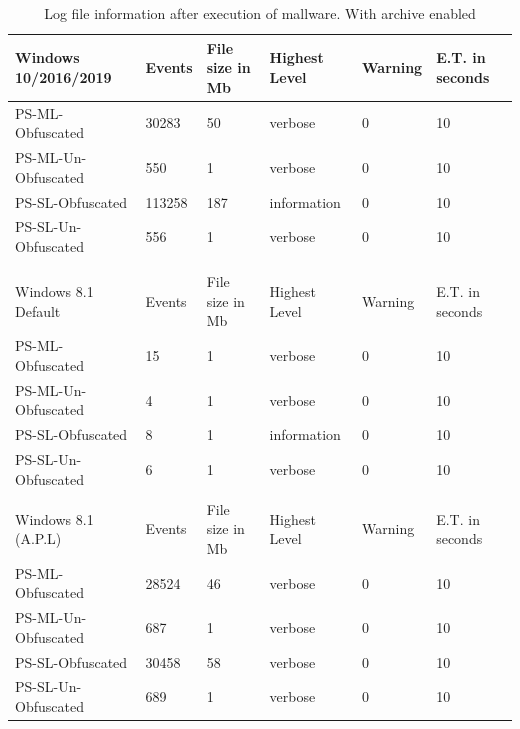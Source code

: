 \documentclass{article}%
\begin{document}
\begin{table}
\begin{center}
\caption {Log file information after execution of mallware. With archive enabled} \label{tab:table_seven}
\begin{tabular}{|l|l|l|l|l|l|}\hline
Windows 10/2016/2019 & Events & File size in Mb & Highest Level & Warning & E.T. in seconds  \\\hline
PS-ML-Obfuscated     & 30283  & 50              & verbose       & 0       & 10               \\\hline
PS-ML-Un-Obfuscated  & 550    & 1               & verbose       & 0       & 10               \\\hline
PS-SL-Obfuscated     & 113258 & 187             & information   & 0       & 10               \\\hline
PS-SL-Un-Obfuscated  & 556    & 1               & verbose       & 0       & 10               \\\hline
                     &        &                 &               &         &                  \\\hline
                     &        &                 &               &         &                  \\\hline
Windows 8.1 Default  & Events & File size in Mb & Highest Level & Warning & E.T. in seconds  \\\hline
PS-ML-Obfuscated     & 15     & 1               & verbose       & 0       & 10               \\\hline
PS-ML-Un-Obfuscated  & 4      & 1               & verbose       & 0       & 10               \\\hline
PS-SL-Obfuscated     & 8      & 1               & information   & 0       & 10               \\\hline
PS-SL-Un-Obfuscated  & 6      & 1               & verbose       & 0       & 10               \\\hline
                     &        &                 &               &         &                  \\\hline
Windows 8.1 (A.P.L)  & Events & File size in Mb & Highest Level & Warning & E.T. in seconds  \\\hline
PS-ML-Obfuscated     & 28524  & 46              & verbose       & 0       & 10               \\\hline
PS-ML-Un-Obfuscated  & 687    & 1               & verbose       & 0       & 10               \\\hline
PS-SL-Obfuscated     & 30458  & 58              & verbose       & 0       & 10               \\\hline
PS-SL-Un-Obfuscated  & 689    & 1               & verbose       & 0       & 10               \\\hline
\end{tabular}
\end{center}
\end{table}
\newpage
\end{document}
